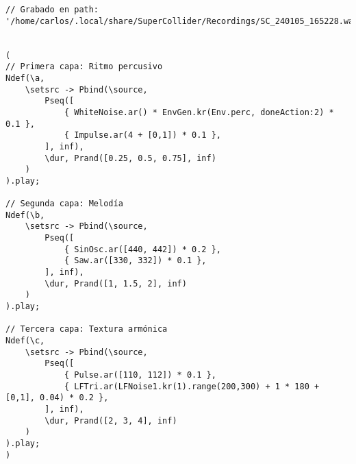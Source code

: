 \begin{minipage}[t]{1\textwidth}
    \centering
    \begin{lstlisting}[style=SuperCollider-IDE, basicstyle=\footnotesize\ttfamily, numbers=none]
// Grabado en path: '/home/carlos/.local/share/SuperCollider/Recordings/SC_240105_165228.wav'


(
// Primera capa: Ritmo percusivo
Ndef(\a,
    \setsrc -> Pbind(\source,
        Pseq([
            { WhiteNoise.ar() * EnvGen.kr(Env.perc, doneAction:2) * 0.1 },
            { Impulse.ar(4 + [0,1]) * 0.1 },
        ], inf),
        \dur, Prand([0.25, 0.5, 0.75], inf)
    )
).play;

// Segunda capa: Melodía
Ndef(\b,
    \setsrc -> Pbind(\source,
        Pseq([
            { SinOsc.ar([440, 442]) * 0.2 },
            { Saw.ar([330, 332]) * 0.1 },
        ], inf),
        \dur, Prand([1, 1.5, 2], inf)
    )
).play;

// Tercera capa: Textura armónica
Ndef(\c,
    \setsrc -> Pbind(\source,
        Pseq([
            { Pulse.ar([110, 112]) * 0.1 },
            { LFTri.ar(LFNoise1.kr(1).range(200,300) + 1 * 180 + [0,1], 0.04) * 0.2 },
        ], inf),
        \dur, Prand([2, 3, 4], inf)
    )
).play;
)     
    \end{lstlisting}
    \vspace{1cm}
\end{minipage}








